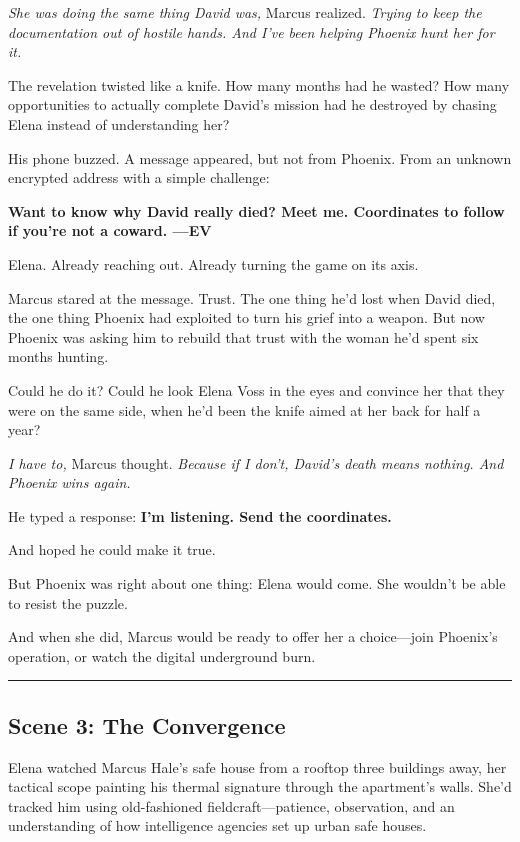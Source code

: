 \emph{She was doing the same thing David was,} Marcus realized. \emph{Trying to keep the documentation out of hostile hands. And I've been helping Phoenix hunt her for it.}

The revelation twisted like a knife. How many months had he wasted? How many opportunities to actually complete David's mission had he destroyed by chasing Elena instead of understanding her?

His phone buzzed. A message appeared, but not from Phoenix. From an unknown encrypted address with a simple challenge:

\textbf{Want to know why David really died? Meet me. Coordinates to follow if you're not a coward. ---EV}

Elena. Already reaching out. Already turning the game on its axis.

Marcus stared at the message. Trust. The one thing he'd lost when David died, the one thing Phoenix had exploited to turn his grief into a weapon. But now Phoenix was asking him to rebuild that trust with the woman he'd spent six months hunting.

Could he do it? Could he look Elena Voss in the eyes and convince her that they were on the same side, when he'd been the knife aimed at her back for half a year?

\emph{I have to,} Marcus thought. \emph{Because if I don't, David's death means nothing. And Phoenix wins again.}

He typed a response: \textbf{I'm listening. Send the coordinates.}

And hoped he could make it true.

But Phoenix was right about one thing: Elena would come. She wouldn't be able to resist the puzzle.

And when she did, Marcus would be ready to offer her a choice---join Phoenix's operation, or watch the digital underground burn.

\begin{center}\rule{0.5\linewidth}{0.5pt}\end{center}

\hypertarget{scene-3-the-convergence}{%
\subsection{Scene 3: The Convergence}\label{scene-3-the-convergence}}

Elena watched Marcus Hale's safe house from a rooftop three buildings away, her tactical scope painting his thermal signature through the apartment's walls. She'd tracked him using old-fashioned fieldcraft---patience, observation, and an understanding of how intelligence agencies set up urban safe houses.

